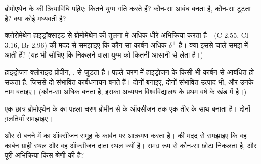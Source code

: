 \begin{exercise}[$\star\star$]\label{exo:g12:curly-arrows:10}
ब्रोमोएथेन के  की क्रियाविधि पढ़िए: कितने युग्म
गति करते हैं? कौन-सा आबंध बनता है, कौन-सा टूटता है? क्या कोई मध्यवर्ती है?
\end{exercise}

\begin{exercise}[$\star\star$]\label{exo:g12:curly-arrows:11}
क्लोरोमेथेन हाइड्रॉक्साइड  से ब्रोमोमेथेन की तुलना में अधिक धीरे
अभिक्रिया करता है।  (C 2.55, Cl 3.16, Br 2.96) की मदद से
समझाइए कि कौन-सा कार्बन अधिक $\delta^+$ है। क्या इससे
चालें समझ में आती हैं? (यह भी सोचिए कि निकलने वाला  युग्म को कितनी आसानी से लेता है।)
\end{exercise}

\begin{exercise}[$\star\star\star$]\label{exo:g12:curly-arrows:12}
हाइड्रोजन क्लोराइड प्रोपीन, , से जुड़ता है। पहले चरण में
हाइड्रोजन   के किसी भी कार्बन से आबंधित हो सकता है, जिससे
दो संभावित कार्बधनायन बनते हैं। दोनों बनाइए, दोनों संभावित उत्पाद भी, और उनके
नाम बताइए। (कौन-सा अधिक बनता है, इसका अध्ययन विश्वविद्यालय के प्रथम वर्ष के खंड में है।)
\end{exercise}

\begin{exercise}[$\star\star\star$]\label{exo:g12:curly-arrows:13}
एक छात्र ब्रोमोएथेन के  का पहला चरण ब्रोमीन  से
 के ऑक्सीजन तक एक तीर के साथ बनाता है। दोनों
ग़लतियाँ समझाइए।
\end{exercise}

\begin{exercise}[$\star\star\star$]\label{exo:g12:curly-arrows:14}
 और  से  बनने में
 का ऑक्सीजन  समूह के कार्बन पर आक्रमण करता है। 
की मदद से समझाइए कि वह कार्बन ग्राही स्थल और वह
ऑक्सीजन दाता स्थल क्यों है। समग्र रूप से कौन-सा छोटा  निकलता है, और पूरी
अभिक्रिया किस श्रेणी की है?
\end{exercise}

